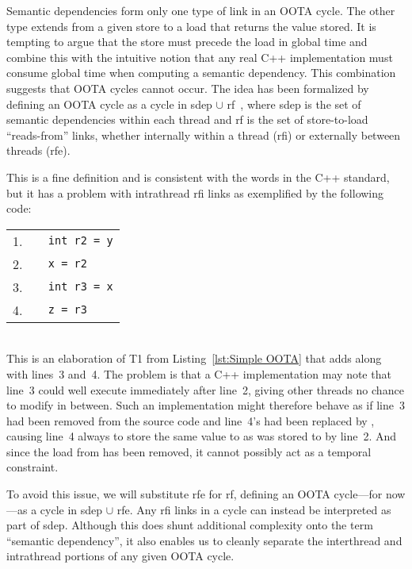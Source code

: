 Semantic dependencies form only one type of link in an OOTA cycle.
The other type extends from a given store to a load that returns the
value stored.
It is tempting to argue that the store must precede
the load in global time and combine this with the intuitive notion that
any real C++ implementation must consume global time when computing a
semantic dependency.
This combination suggests that OOTA cycles cannot occur.
The idea has been formalized by defining an OOTA cycle as a cycle
in sdep $\cup$ rf~\cite{PaulEMcKenney2014OOTA},
where sdep is the set of semantic dependencies within each thread and
rf is the set of store-to-load ``reads-from'' links, whether internally
within a thread (rfi) or externally between threads (rfe).

This is a fine definition and is consistent with the words in the C++
standard, but it has a problem with intrathread rfi links
as exemplified by the following code: \\
{
\small
\begin{tabular}{rl}
1. &
\texttt{~~int r2 = y} \\
2. &
\texttt{~~x = r2} \\
3. &
\texttt{~~int r3 = x} \\
4. &
\texttt{~~z = r3} \\
\end{tabular}
} \\
This is an elaboration of T1 from
Listing~\ref{lst:Simple OOTA}
that adds  along with lines~3 and~4.
The problem is that a C++ implementation may
note that line~3 could well execute immediately after line~2, giving
other threads no chance to modify  in between.
Such an implementation might therefore behave as if line~3 had been
removed from the source code and line~4's  had been replaced by
,
causing line~4 always to store the same value to  as was stored
to  by line~2.
And since the load from  has been removed, it cannot possibly
act as a temporal constraint.

To avoid this issue, we will substitute rfe
for rf, defining an OOTA cycle---for now---as a cycle in sdep $\cup$ rfe.
Any rfi links in a cycle can instead be interpreted as part of sdep.
Although this does shunt additional complexity onto the term
``semantic dependency'', it also enables us to cleanly separate
the interthread and intrathread portions of any given OOTA cycle.

